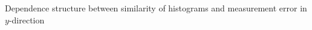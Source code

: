 \label{fig:cor_sim_confi_y}
Dependence structure between similarity of histograms and measurement error in $y$-direction